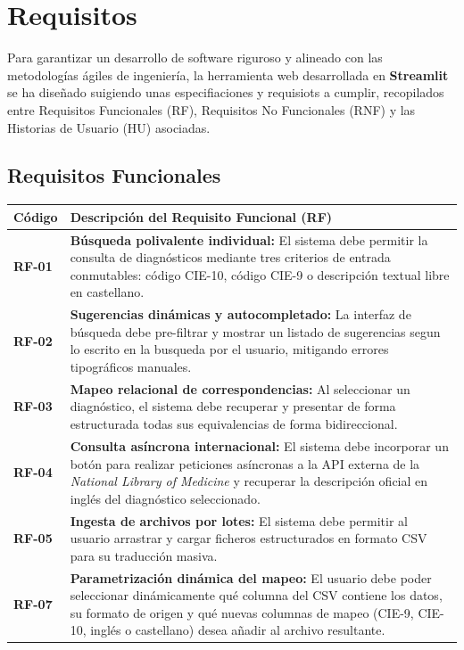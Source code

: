 \documentclass[12pt,a4paper,onecolumn,oneside]{report}
\begin{document}
\section{Requisitos}

Para garantizar un desarrollo de software riguroso y alineado con las metodologías ágiles de ingeniería, la herramienta web desarrollada en \textbf{Streamlit} se ha diseñado suigiendo unas especifiaciones y requisiots a cumplir, recopilados entre Requisitos Funcionales (RF), Requisitos No Funcionales (RNF) y las Historias de Usuario (HU) asociadas.

\subsection{Requisitos Funcionales}
\begin{table}[htbp]
\centering
\small
\renewcommand{\arraystretch}{0.9}
\begin{tabular}{lp{10cm}}
\hline
\textbf{Código} & \textbf{Descripción del Requisito Funcional (RF)} \\ \hline
\textbf{RF-01} & \textbf{Búsqueda polivalente individual:} El sistema debe permitir la consulta de diagnósticos mediante tres criterios de entrada conmutables: código CIE-10, código CIE-9 o descripción textual libre en castellano. \\
\textbf{RF-02} & \textbf{Sugerencias dinámicas y autocompletado:} La interfaz de búsqueda debe pre-filtrar y mostrar un listado de sugerencias segun lo escrito en la busqueda por el usuario, mitigando errores tipográficos manuales. \\
\textbf{RF-03} & \textbf{Mapeo relacional de correspondencias:} Al seleccionar un diagnóstico, el sistema debe recuperar y presentar de forma estructurada todas sus equivalencias de forma bidireccional. \\
\textbf{RF-04} & \textbf{Consulta asíncrona internacional:} El sistema debe incorporar un botón para realizar peticiones asíncronas a la API externa de la \textit{National Library of Medicine} y recuperar la descripción oficial en inglés del diagnóstico seleccionado. \\
\textbf{RF-05} & \textbf{Ingesta de archivos por lotes:} El sistema debe permitir al usuario arrastrar y cargar ficheros estructurados en formato CSV para su traducción masiva. \\
\textbf{RF-07} & \textbf{Parametrización dinámica del mapeo:} El usuario debe poder seleccionar dinámicamente qué columna del CSV contiene los datos, su formato de origen y qué nuevas columnas de mapeo (CIE-9, CIE-10, inglés o castellano) desea añadir al archivo resultante. \\

\end{tabular}
\end{table}
\end{document}
